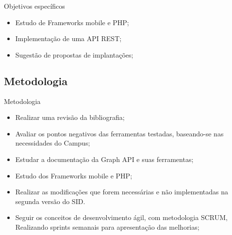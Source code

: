 \documentclass{aula-ifb}
\begin{document}
\begin{frame}{Objetivos específicos}
	\begin{itemize}
   		\item Estudo de Frameworks mobile e PHP;
   		\vspace{10px}
   		\item Implementação de uma API REST;
   		\vspace{10px}
   		\item Sugestão de propostas de implantações;
	\end{itemize}
\end{frame}

\subsection{Metodologia}
\begin{frame}{Metodologia}
	\begin{itemize}
   		\item Realizar uma revisão da bibliografia;
   		\vspace{10px}
   		\item Avaliar os pontos negativos das ferramentas testadas, baseando-se nas necessidades do Campus;
   		\vspace{10px}
   		\item Estudar a documentação da Graph API e suas ferramentas;
   		\vspace{10px}
   		\item Estudo dos Frameworks mobile e PHP;
   		\vspace{10px}
   		\item Realizar as modificações que forem necessárias e não implementadas na segunda versão do SID.
   		\vspace{10px}
   		\item Seguir os conceitos de desenvolvimento ágil, com metodologia SCRUM, Realizando sprints semanais para apresentação das melhorias;
	\end{itemize}
\end{frame}
\end{document}
